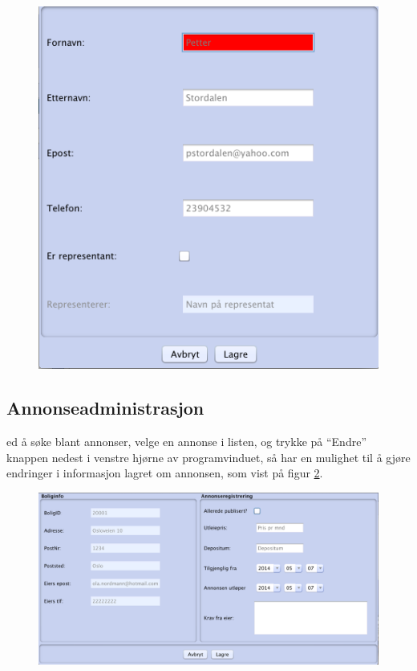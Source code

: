 \begin{figure}[h!]
\center
 \includegraphics[scale=0.5]{./img/brukerveiledning/11.png}
 \caption{}
 \label{fig:bv:11}
\end{figure}




\newpage
\subsection{Annonseadministrasjon}
ed å søke blant annonser, velge en annonse i listen, og trykke på “Endre” knappen nedest i venstre hjørne av programvinduet, så har en mulighet til å gjøre endringer i informasjon lagret om annonsen, som vist på figur \ref{fig:bv:12}.

\begin{figure}[h!]
 \includegraphics[width=\textwidth,height=\textheight,keepaspectratio]{./img/brukerveiledning/12.png}
 \caption{}
 \label{fig:bv:12}
\end{figure}




